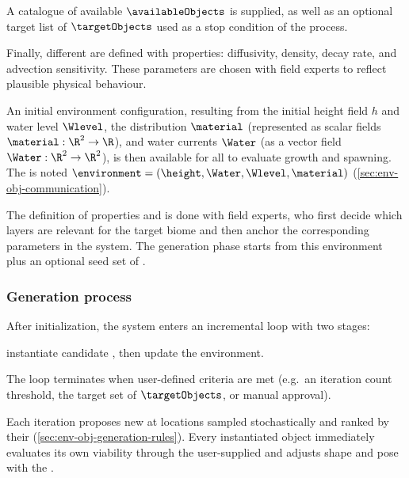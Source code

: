 A catalogue of available  $\availableObjects$ is supplied, as well as an optional target list of  $\targetObjects$ used as a stop condition of the process.

Finally, different  are defined with properties: diffusivity, density, decay rate, and advection sensitivity. These parameters are chosen with field experts to reflect plausible physical behaviour.

An initial environment configuration, resulting from the initial height field $h$ and water level $\Wlevel$, the  distribution $\material$ (represented as scalar fields $\material: \R^2 \to \R$), and water currents $\Water$ (as a vector field $\Water: \R^2 \to \R^2$), is then available for all  to evaluate growth and spawning. The  is noted $\environment = (\height, \Water, \Wlevel, \material)$ (\cref{sec:env-obj-communication}).

The definition of  properties and  is done with field experts, who first decide which  layers are relevant for the target biome and then anchor the corresponding parameters in the system.
The generation phase starts from this environment plus an optional seed set of .

\subsubsection{Generation process}

After initialization, the system enters an incremental loop with two stages:
\begin{Itemize}
    \Item{-} instantiate candidate , then
    \Item{-} update the environment.
\end{Itemize}
The loop terminates when user-defined criteria are met (e.g.\ an iteration count threshold, the target set of  $\targetObjects$, or manual approval).


Each iteration proposes new  at locations sampled stochastically and ranked by their  (\cref{sec:env-obj-generation-rules}).
Every instantiated object immediately evaluates its own viability through the user-supplied  and adjusts shape and pose with the .


